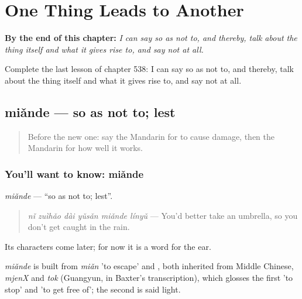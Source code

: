 
\chapter{One Thing Leads to Another}
\label{ch:zh-one-thing-leads-to-another}

\begin{chapteropening}
\textbf{By the end of this chapter:} \emph{I can say so as not to, and thereby, talk about the thing itself and what it gives rise to, and say not at all.}

Complete the last lesson of chapter 538: I can say so as not to, and thereby, talk about the thing itself and what it gives rise to, and say not at all.
\end{chapteropening}

\section[miǎnde]{miǎnde — so as not to; lest}

\label{lesson:ZH-C538-miande}



\begin{quote}
Before the new one: say the Mandarin for to cause damage, then the Mandarin for how well it works.
\end{quote}

\subsection*{You'll want to know: miǎnde}
\emph{miǎnde} — \textquotedblleft{}so as not to; lest\textquotedblright{}.

\begin{quote}
\emph{nǐ zuìhǎo dài yǔsǎn miǎnde línyǔ} — You'd better take an umbrella, so you don't get caught in the rain.
\end{quote}

Its characters come later; for now it is a word for the ear.

\begin{cousinweb}
\emph{miǎnde} is built from \emph{miǎn} 'to escape' and , both inherited from Middle Chinese, \emph{mjenX} and \emph{tok} (Guangyun, in Baxter's transcription), which glosses the first 'to stop' and 'to get free of'; the second is said light.
\end{cousinweb}

